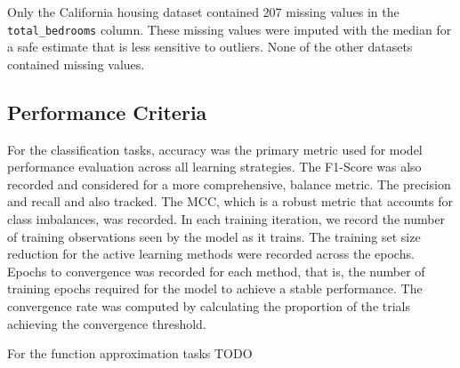 \documentclass[10pt, conference]{IEEEtran}
\begin{document}
Only the California housing dataset contained 207 missing values in the \texttt{total\_bedrooms} column. These missing values were imputed with the median for a safe estimate that is less sensitive to outliers. None of the other datasets contained missing values.






\subsection{Performance Criteria}
For the classification tasks, accuracy was the primary metric used for model performance evaluation across all learning strategies. The F1-Score was also recorded and considered for a more comprehensive, balance metric. The precision and recall and also tracked. The MCC, which is a robust metric that accounts for class imbalances, was recorded. In each training iteration, we record the number of training observations seen by the model as it trains. The training set size reduction for the active learning methods were recorded across the epochs. Epochs to convergence was recorded for each method, that is, the number of training epochs required for the model to achieve a stable performance. The convergence rate was computed by calculating the proportion of the trials achieving the convergence threshold.

For the function approximation tasks TODO
\end{document}
